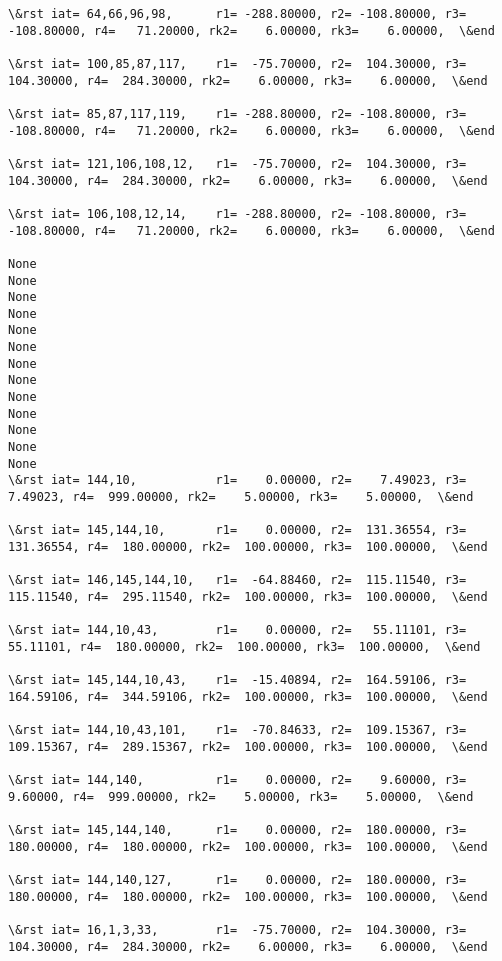 \documentclass[11pt]{article}
\begin{document}
\begin{Verbatim}[commandchars=\\\{\}]
\&rst iat= 64,66,96,98,      r1= -288.80000, r2= -108.80000, r3= -108.80000, r4=   71.20000, rk2=    6.00000, rk3=    6.00000,  \&end

\&rst iat= 100,85,87,117,    r1=  -75.70000, r2=  104.30000, r3=  104.30000, r4=  284.30000, rk2=    6.00000, rk3=    6.00000,  \&end

\&rst iat= 85,87,117,119,    r1= -288.80000, r2= -108.80000, r3= -108.80000, r4=   71.20000, rk2=    6.00000, rk3=    6.00000,  \&end

\&rst iat= 121,106,108,12,   r1=  -75.70000, r2=  104.30000, r3=  104.30000, r4=  284.30000, rk2=    6.00000, rk3=    6.00000,  \&end

\&rst iat= 106,108,12,14,    r1= -288.80000, r2= -108.80000, r3= -108.80000, r4=   71.20000, rk2=    6.00000, rk3=    6.00000,  \&end

None
None
None
None
None
None
None
None
None
None
None
None
None
\&rst iat= 144,10,           r1=    0.00000, r2=    7.49023, r3=    7.49023, r4=  999.00000, rk2=    5.00000, rk3=    5.00000,  \&end

\&rst iat= 145,144,10,       r1=    0.00000, r2=  131.36554, r3=  131.36554, r4=  180.00000, rk2=  100.00000, rk3=  100.00000,  \&end

\&rst iat= 146,145,144,10,   r1=  -64.88460, r2=  115.11540, r3=  115.11540, r4=  295.11540, rk2=  100.00000, rk3=  100.00000,  \&end

\&rst iat= 144,10,43,        r1=    0.00000, r2=   55.11101, r3=   55.11101, r4=  180.00000, rk2=  100.00000, rk3=  100.00000,  \&end

\&rst iat= 145,144,10,43,    r1=  -15.40894, r2=  164.59106, r3=  164.59106, r4=  344.59106, rk2=  100.00000, rk3=  100.00000,  \&end

\&rst iat= 144,10,43,101,    r1=  -70.84633, r2=  109.15367, r3=  109.15367, r4=  289.15367, rk2=  100.00000, rk3=  100.00000,  \&end

\&rst iat= 144,140,          r1=    0.00000, r2=    9.60000, r3=    9.60000, r4=  999.00000, rk2=    5.00000, rk3=    5.00000,  \&end

\&rst iat= 145,144,140,      r1=    0.00000, r2=  180.00000, r3=  180.00000, r4=  180.00000, rk2=  100.00000, rk3=  100.00000,  \&end

\&rst iat= 144,140,127,      r1=    0.00000, r2=  180.00000, r3=  180.00000, r4=  180.00000, rk2=  100.00000, rk3=  100.00000,  \&end

\&rst iat= 16,1,3,33,        r1=  -75.70000, r2=  104.30000, r3=  104.30000, r4=  284.30000, rk2=    6.00000, rk3=    6.00000,  \&end


\end{Verbatim}
\end{document}
